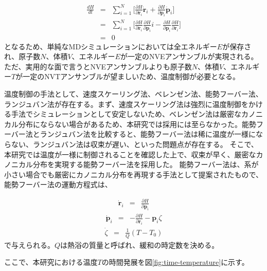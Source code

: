 \documentclass[titlepage]{jsreport}
\begin{document}
\large
\begin{eqnarray}
\frac{dH}{dt} &=& \sum_{i=1}^N\Bigg[\frac{\partial H}{\partial \mathbf{r}_i}\dot{\mathbf{r}}_i+\frac{\partial H}{\partial \mathbf{p}_i}\dot{\mathbf{p}}_i\Bigg] \nonumber \\
              &=&  \sum_{i=1}^N\Bigg[\frac{\partial H}{\partial \mathbf{r}_i}\frac{\partial H}{\partial \mathbf{p}_i}i-\frac{\partial H}{\partial \mathbf{p}_i}\frac{\partial H}{\partial \mathbf{r}_i}\Bigg] \nonumber \\
              &=& 0 \label{eq:molecular-dynamics-hamilton-H}
\end{eqnarray}
\normalsize
となるため、単純なMDシミュレーションにおいては全エネルギー$E$が保存され、原子数$N$、体積$V$、エネルギー$E$が一定のNVEアンサンブル\cite{nve-ensemble}が実現される。
ただ、実用的な面で言うとNVEアンサンブルよりも原子数$N$、体積$V$、エネルギー$T$が一定のNVTアンサンブル\cite{nvt-ensemble}が望ましいため、温度制御が必要となる。

温度制御の手法として、速度スケーリング法\cite{velocity-scaling}、ベレンゼン法\cite{berendsen}、能勢フーバー法\cite{nose,hoover}、ランジュバン法\cite{langevin}が存在する。まず、速度スケーリング法は強烈に温度制御をかける手法でシミュレーションとして安定しないため、ベレンゼン法は厳密なカノニカル分布にならない場合があるため、本研究では採用には至らなかった。能勢フーバー法とランジュバン法を比較すると、能勢フーバー法は稀に温度が一様にならない、ランジュバン法は収束が遅い、といった問題点が存在する。
そこで、本研究では温度が一様に制御されることを確認した上で、収束が早く、厳密なカノニカル分布を実現する能勢フーバー法を採用した。
能勢フーバー法は、系が小さい場合でも厳密にカノニカル分布を再現する手法として提案されたもので、能勢フーバー法の運動方程式は、

\large
\begin{eqnarray}
\dot{\mathbf{r}}_i &=& \frac{\partial H}{\partial \mathbf{p}_i} \label{eq:nose-hoover-r}
\end{eqnarray}
\normalsize
\large
\begin{eqnarray}
\dot{\mathbf{p}}_i &=& -\frac{\partial H}{\partial \mathbf{r}_i}-\mathbf{p}_i\zeta \label{eq:nose-hoover-p}
\end{eqnarray}
\normalsize
\large
\begin{eqnarray}
\dot{\zeta} &=& \frac{1}{Q}(T-T_0) \label{eq:nose-hoover-zeta}
\end{eqnarray}
\normalsize
で与えられる。$Q$は熱浴の質量と呼ばれ、緩和の時定数を決める。

ここで、本研究における温度$T$の時間発展を図\ref{fig:time-temperature}に示す。
\end{document}

